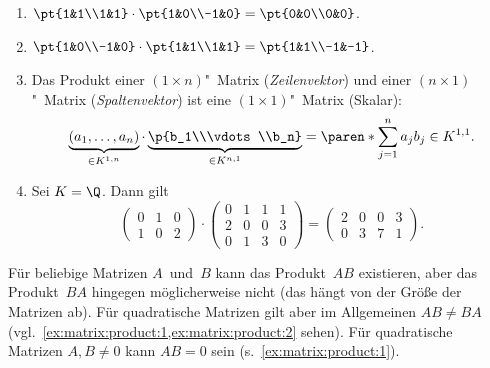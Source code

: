 \documentclass[a4paper]{article}
\begin{document}
\begin{example}\label{ex:matrix:product}\leavevmode
    \begin{enumerate}
        \item $\pt{1&1\\1&1} \cdot \pt{1&0\\-1&0} = \pt{0&0\\0&0}$.\label{ex:matrix:product:1}
        \item $\pt{1&0\\-1&0} \cdot \pt{1&1\\1&1} = \pt{1&1\\-1&-1}$.\label{ex:matrix:product:2}
        \item Das Produkt einer $(1\times n)$"~Matrix (\emph{Zeilenvektor}) und einer $(n\times1)$"~Matrix (\emph{Spaltenvektor}) ist eine $(1\times1)$"~Matrix (Skalar):
        \begin{equation*}
            \underbrace{(a_1,\dots,a_n)}_{\in K^{1,n}} \cdot \underbrace{\p{b_1\\\vdots\\b_n}}_{\in K^{n, 1}} = \paren*{\sum_{j=1}^n a_jb_j} \in K^{1, 1}.
        \end{equation*}
        \item Sei $K = \Q$. Dann gilt
        \begin{equation*}
            \begin{pmatrix}
                0 & 1 & 0 \\
                1 & 0 & 2
            \end{pmatrix}
            \cdot \begin{pmatrix}
                0 & 1 & 1 & 1 \\
                2 & 0 & 0 & 3 \\
                0 & 1 & 3 & 0
            \end{pmatrix}
            = \begin{pmatrix}
                2 & 0 & 0 & 3 \\
                0 & 3 & 7 & 1
            \end{pmatrix}.
        \end{equation*}
    \end{enumerate}
\end{example}

\begin{remark}
    Für beliebige Matrizen $A$~und~$B$ kann das Produkt~$AB$ existieren, aber das Produkt~$BA$ hingegen möglicherweise nicht (das hängt von der Größe der Matrizen ab). Für quadratische Matrizen gilt aber im Allgemeinen $AB \neq BA$ (vgl.~\cref{ex:matrix:product:1,ex:matrix:product:2} sehen). Für quadratische Matrizen $A,B \neq 0$ kann $AB = 0$ sein (s.~\cref{ex:matrix:product:1}).
\end{remark}
\end{document}
